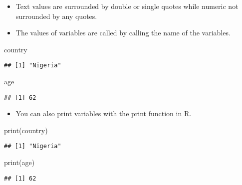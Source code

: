 \documentclass[
]{article}
\newenvironment{Shaded}{\begin{snugshade}}{\end{snugshade}}
\newcommand{\FunctionTok}[1]{\textcolor[rgb]{0.00,0.00,0.00}{#1}}
\newcommand{\NormalTok}[1]{#1}
\providecommand{\tightlist}{%
  \setlength{\itemsep}{0pt}\setlength{\parskip}{0pt}}
\begin{document}
\begin{itemize}
\tightlist
\item
  Text values are surrounded by double or single quotes while numeric
  not surrounded by any quotes.\\
\item
  The values of variables are called by calling the name of the
  variables.
\end{itemize}

\begin{Shaded}
\begin{Highlighting}[]
\NormalTok{country}
\end{Highlighting}
\end{Shaded}

\begin{verbatim}
## [1] "Nigeria"
\end{verbatim}

\begin{Shaded}
\begin{Highlighting}[]
\NormalTok{age}
\end{Highlighting}
\end{Shaded}

\begin{verbatim}
## [1] 62
\end{verbatim}

\begin{itemize}
\tightlist
\item
  You can also print variables with the print function in R.
\end{itemize}

\begin{Shaded}
\begin{Highlighting}[]
\FunctionTok{print}\NormalTok{(country)}
\end{Highlighting}
\end{Shaded}

\begin{verbatim}
## [1] "Nigeria"
\end{verbatim}

\begin{Shaded}
\begin{Highlighting}[]
\FunctionTok{print}\NormalTok{(age)}
\end{Highlighting}
\end{Shaded}

\begin{verbatim}
## [1] 62
\end{verbatim}
\end{document}

